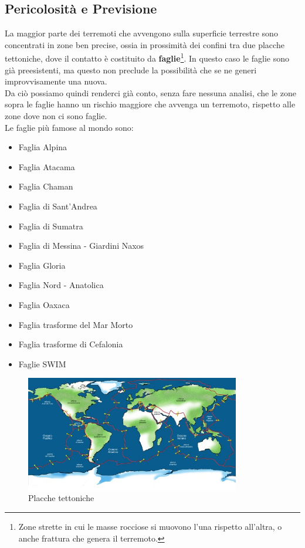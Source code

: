 \subsection{Pericolosit\`a e Previsione}\label{previsione}

La maggior parte dei terremoti che avvengono sulla superficie terrestre sono concentrati in zone ben precise, ossia in prossimit\`a dei confini tra due placche tettoniche, dove il contatto \`e costituito da \textbf{faglie}\footnote{Zone strette in cui le masse rocciose si muovono l'una rispetto all'altra, o anche frattura che genera il terremoto.}. In questo caso le faglie sono gi\`a preesistenti, ma questo non preclude la possibilit\`a che se ne generi improvvisamente una nuova.\\
Da ci\`o possiamo quindi renderci gi\`a conto, senza fare nessuna analisi, che le zone sopra le faglie hanno un rischio maggiore che avvenga un terremoto, rispetto alle zone dove non ci sono faglie. \cite{earthquake}\\
Le faglie pi\`u famose al mondo sono:
\begin{itemize}
    \item Faglia Alpina
    \item Faglia Atacama
    \item Faglia Chaman
    \item Faglia di Sant'Andrea
    \item Faglia di Sumatra
    \item Faglia di Messina - Giardini Naxos
    \item Faglia Gloria
    \item Faglia Nord - Anatolica
    \item Faglia Oaxaca
    \item Faglia trasforme del Mar Morto
    \item Faglia trasforme di Cefalonia
    \item Faglie SWIM
\end{itemize}
\begin{figure}[H]
   \centering
   \includegraphics[width=0.835\textwidth]{images/placcheTettoniche.jpg}
   \caption{Placche tettoniche}
\end{figure}
